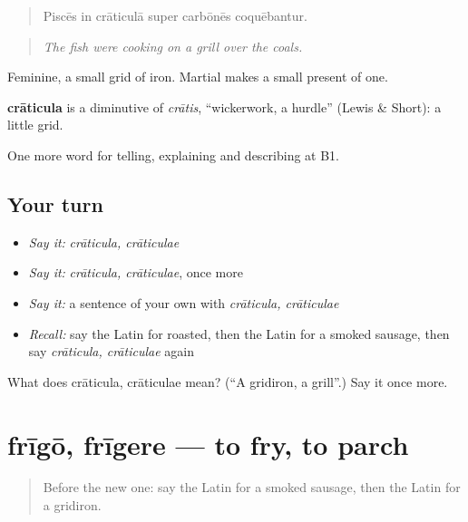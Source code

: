 \begin{quote}
Piscēs in crāticulā super carbōnēs coquēbantur.
\end{quote}

\begin{quote}
\emph{The fish were cooking on a grill over the coals.}
\end{quote}

Feminine, a small grid of iron. Martial makes a small present of one.

\begin{cousinweb}
\textbf{crāticula} is a diminutive of \emph{crātis}, \textquotedblleft{}wickerwork, a hurdle\textquotedblright{} (Lewis \& Short): a little grid.
\end{cousinweb}

\begin{grammarlens}[title={What you've built}]
One more word for telling, explaining and describing at B1.
\end{grammarlens}

\subsection*{Your turn}
\begin{itemize}
\raggedright
  \item \emph{Say it:} \emph{crāticula, crāticulae}
  \item \emph{Say it:} \emph{crāticula, crāticulae}, once more
  \item \emph{Say it:} a sentence of your own with \emph{crāticula, crāticulae}
  \item \emph{Recall:} say the Latin for roasted, then the Latin for a smoked sausage, then say \emph{crāticula, crāticulae} again
\end{itemize}

\begin{tcolorbox}[breakable,colback=teal!4,colframe=teal!35!black,title={Before you move on}]
What does crāticula, crāticulae mean? (\textquotedblleft{}A gridiron, a grill\textquotedblright{}.) Say it once more.
\end{tcolorbox}
\section[frīgō, frīgere]{frīgō, frīgere — to fry, to parch}

\label{lesson:LA-C354-frigo}



\begin{quote}
Before the new one: say the Latin for a smoked sausage, then the Latin for a gridiron.
\end{quote}

